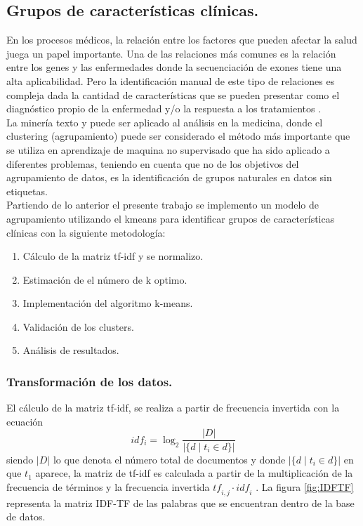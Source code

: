 \subsection{Grupos de características clínicas.}

En los procesos médicos, la relación entre los factores que pueden afectar la salud juega un papel importante. Una de las relaciones más comunes es la relación entre los genes y las enfermedades donde la secuenciación de exones tiene una alta aplicabilidad. Pero la identificación manual de este tipo de relaciones es compleja dada la cantidad de características que se pueden presentar como el diagnóstico propio de la enfermedad y/o la respuesta a los tratamientos \cite{Kawashima2017}.\\

La minería texto y puede ser aplicado al análisis en la medicina, donde el clustering (agrupamiento) puede ser considerado el método más importante que se utiliza en aprendizaje de maquina no supervisado que ha sido aplicado a diferentes problemas\cite{Kawashima2017}, teniendo en cuenta que no de los objetivos del agrupamiento de datos, es la  identificación de grupos naturales en datos sin etiquetas\cite{Jain2010}.\\

Partiendo de lo anterior el presente trabajo se implemento un modelo de agrupamiento utilizando el kmeans  para identificar grupos de características clínicas con la siguiente metodología:

\begin{enumerate}
	\item Cálculo de la matriz tf-idf y se normalizo. 
	\item Estimación de el número de k optimo.
	\item Implementación del algoritmo k-means.
	\item Validación de los clusters.
	\item Análisis de resultados. 	  
\end{enumerate}

\subsubsection{Transformación de los datos.}

El cálculo de la matriz tf-idf, se realiza a partir de frecuencia invertida con la ecuación 
$${idf}_i = \log_2 \frac{|D|}{|\{d \mid t_i \in d\}|}$$
siendo $|D|$ lo que denota el número total de documentos y donde $|\{d\mid t_i \in d\}|$ en  que $t_1$ aparece, la matriz de tf-idf es calculada a partir de la multiplicación de la frecuencia de términos y la frecuencia invertida $\mathit{tf}_{i,j} \cdot \mathit{idf}_i$ \cite{Buckley1988}. 
La figura \ref{fig:IDFTF} representa la matriz IDF-TF de las palabras que se encuentran dentro de la base de datos.  

